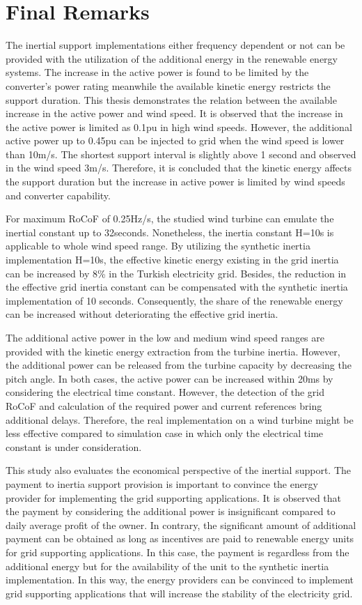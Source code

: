 \section{Final Remarks}
The inertial support implementations either frequency dependent or not can be provided with the utilization of the additional energy in the renewable energy systems. The increase in the active power is found to be limited by the converter's power rating meanwhile the available kinetic energy restricts the support duration. This thesis demonstrates the relation between the available increase in the active power and wind speed. It is observed that the increase in the active power is limited as 0.1pu in high wind speeds. However, the additional active power up to 0.45pu can be injected to grid when the wind speed is lower than 10m/s. The shortest support interval is slightly above 1 second and observed in the wind speed 3m/s. Therefore, it is concluded that the kinetic energy affects the support duration but the increase in active power is limited by wind speeds and converter capability. \par
For maximum RoCoF of 0.25Hz/s, the studied wind turbine can emulate the inertial constant up to 32seconds. Nonetheless, the inertia constant H=10s is applicable to whole wind speed range. By utilizing the synthetic inertia implementation H=10s, the effective kinetic energy existing in the grid inertia can be increased by 8\% in the Turkish electricity grid. Besides, the reduction in the effective grid inertia constant can be compensated with the synthetic inertia implementation of 10 seconds. Consequently, the share of the renewable energy can be increased without deteriorating the effective grid inertia.\par
The additional active power in the low and medium wind speed ranges are provided with the kinetic energy extraction from the turbine inertia. However, the additional power can be released from the turbine capacity by decreasing the pitch angle. In both cases, the active power can be increased within 20ms by considering the electrical time constant. However, the detection of the grid RoCoF and calculation of the required power and current references bring additional delays. Therefore, the real implementation on a wind turbine might be less effective compared to simulation case in which only the electrical time constant is under consideration.\par
This study also evaluates the economical perspective of the inertial support. The payment to inertia support provision is important to convince the energy provider for implementing the grid supporting applications. It is observed that the payment by considering the additional power is insignificant compared to daily average profit of the owner. In contrary, the significant amount of additional payment can be obtained as long as incentives are paid to renewable energy units for grid supporting applications. In this case, the payment is regardless from the additional energy but for the availability of the unit to the synthetic inertia implementation. In this way, the energy providers can be convinced to implement grid supporting applications that will increase the stability of the electricity grid.
\newpage
